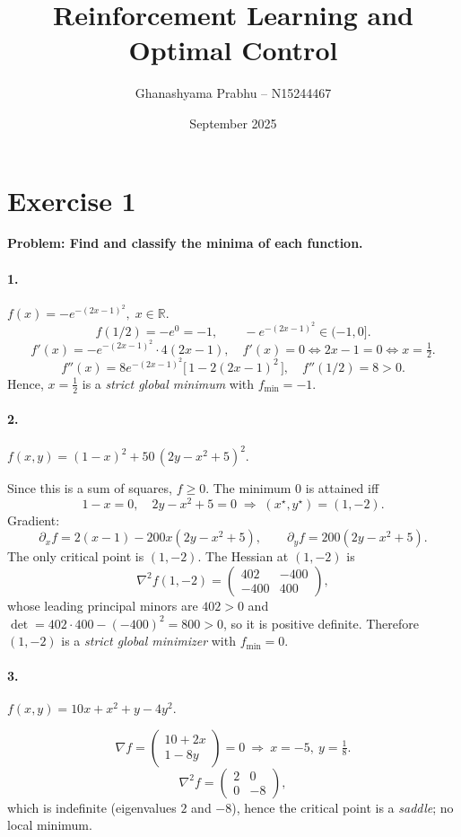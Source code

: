 \documentclass{article}
\title{Reinforcement Learning and Optimal Control}
\author{Ghanashyama Prabhu -- N15244467}
\date{September 2025}
\begin{document}
\maketitle

\section{Exercise 1}
\textbf{Problem: Find and classify the minima of each function.}

\paragraph{1.} $f(x)= -e^{-(2x-1)^2},\; x\in\mathbb{R}.$
\[
f(1/2) = -e^{0} = -1,\qquad -e^{-(2x-1)^2}\in(-1,0].
\]
\[
f'(x) = -e^{-(2x-1)^2}\cdot 4(2x-1),\quad f'(x)=0 \iff 2x-1=0 \iff x=\tfrac12.
\]
\[
f''(x) = 8e^{-(2x-1)^2}\!\bigl[\,1-2(2x-1)^2\,\bigr],\quad f''(1/2)=8>0.
\]
Hence, $x=\tfrac12$ is a \emph{strict global minimum} with $f_{\min}=-1$.

\paragraph{2.} $f(x,y)=(1-x)^2+50\,(2y-x^2+5)^2.$

Since this is a sum of squares, $f\ge 0$. The minimum $0$ is attained iff
\[
1-x=0,\quad 2y-x^2+5=0 \;\Rightarrow\; (x^\star,y^\star)=(1,-2).
\]
Gradient:
\[
\partial_x f=2(x-1)-200x(2y-x^2+5),\qquad \partial_y f=200(2y-x^2+5).
\]
The only critical point is $(1,-2)$. The Hessian at $(1,-2)$ is
\[
\nabla^2 f(1,-2)=
\begin{pmatrix}
402 & -400\\
-400 & 400
\end{pmatrix},
\]
whose leading principal minors are $402>0$ and $\det=402\cdot 400-(-400)^2=800>0$, so it is positive definite. Therefore $(1,-2)$ is a \emph{strict global minimizer} with $f_{\min}=0$.

\paragraph{3.} $f(x,y)=10x+x^2+y-4y^2.$

\[
\nabla f = \begin{pmatrix} 10+2x \\ 1-8y \end{pmatrix} = 0
\ \Rightarrow\ x=-5,\ y=\tfrac{1}{8}.
\]
\[
\nabla^2 f=\begin{pmatrix} 2 & 0\\ 0 & -8\end{pmatrix},
\]
which is indefinite (eigenvalues $2$ and $-8$), hence the critical point is a \emph{saddle}; no local minimum.
\end{document}
